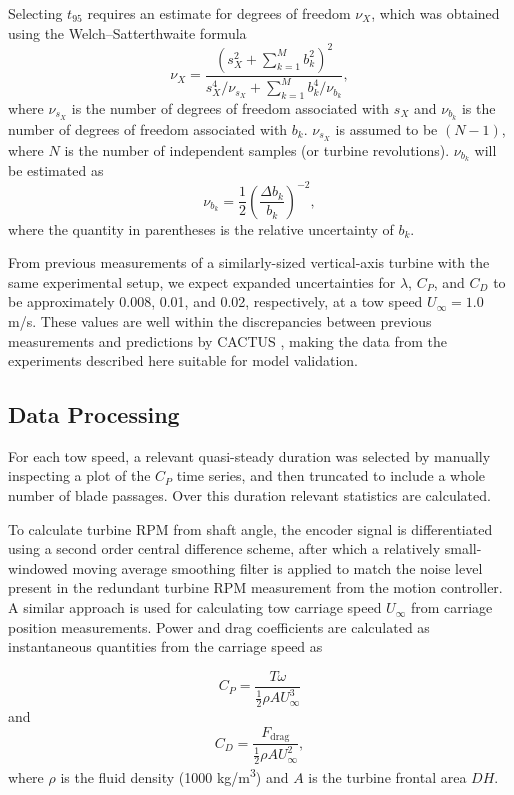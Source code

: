 \documentclass[10pt,letterpaper]{article}
\begin{document}
Selecting $t_{95}$ requires an estimate for degrees of freedom $\nu_X$, which
was obtained using the Welch--Satterthwaite formula
\begin{equation}
    \nu_X = \frac{\left(s_X^2 + \sum_{k=1}^M b_k^2 \right)^2} {s_X^4/\nu_{s_X} +
        \sum_{k=1}^M b_k^4/\nu_{b_k}},
\end{equation}
where $\nu_{s_X}$ is the number of degrees of freedom associated with $s_X$ and
$\nu_{b_k}$ is the number of degrees of freedom associated with $b_k$.
$\nu_{s_X}$ is assumed to be $(N-1)$, where $N$ is the number of independent
samples (or turbine revolutions). $\nu_{b_k}$ will be estimated as
\begin{equation}
    \nu_{b_k} = \frac{1}{2} \left( \frac{\Delta b_k}{b_k} \right)^{-2},
\end{equation}
where the quantity in parentheses is the relative uncertainty of $b_k$.

From previous measurements of a similarly-sized vertical-axis turbine with the
same experimental setup, we expect expanded uncertainties for $\lambda$, $C_P$,
and $C_D$ to be approximately 0.008, 0.01, and 0.02, respectively, at a tow
speed $U_\infty = 1.0$ m/s. These values are well within the discrepancies
between previous measurements and predictions by CACTUS \cite{Michelen2014},
making the data from the experiments described here suitable for model validation.


\subsection*{Data Processing}

For each tow speed, a relevant quasi-steady duration was selected by manually
inspecting a plot of the $C_P$ time series, and then truncated to include a
whole number of blade passages. Over this duration relevant statistics are
calculated.

To calculate turbine RPM from shaft angle, the encoder signal is differentiated
using a second order central difference scheme, after which a relatively
small-windowed moving average smoothing filter is applied to match the noise
level present in the redundant turbine RPM measurement from the motion
controller. A similar approach is used for calculating tow carriage speed
$U_\infty$ from carriage position measurements. Power and drag coefficients are
calculated as instantaneous quantities from the carriage speed as

\begin{equation}
    C_P = \frac{T \omega}{\frac{1}{2} \rho A U_\infty^3}
\end{equation}
and
\begin{equation}
    C_D = \frac{F_\mathrm{drag}}{\frac{1}{2} \rho A U_\infty^2},
\end{equation}
where $\rho$ is the fluid density (1000 kg/m\textsuperscript{3}) and $A$ is
the turbine frontal area $DH$.
\end{document}

